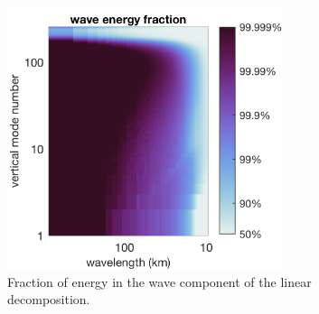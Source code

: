 \documentclass[10pt]{article}
\begin{document}
\begin{figure}[t]
  \centerline{\includegraphics[width=19pc,angle=0]{figures/EnergyFraction-nonlinear}}
  \caption{Fraction of energy in the wave component of the linear decomposition. }
  \label{EnergyFraction-nonlinear}
\end{figure}
\end{document}
